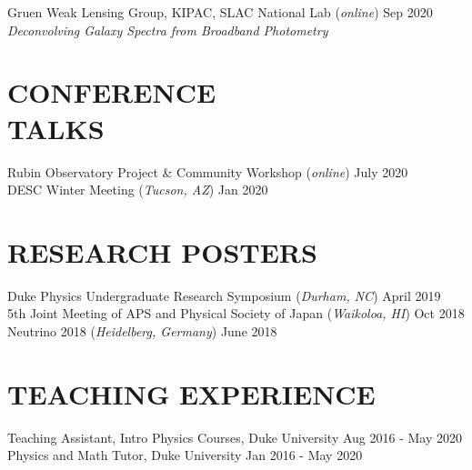 \documentclass[margin]{res}
\begin{document}
\begin{resume}
Gruen Weak Lensing Group, KIPAC, SLAC National Lab (\textit{online}) \hfill Sep 2020 \\
\textit{Deconvolving Galaxy Spectra from Broadband Photometry} \\

\section{\normalfont CONFERENCE \\TALKS}

Rubin Observatory Project \& Community Workshop (\textit{online}) \hfill July 2020 \\
DESC Winter Meeting (\textit{Tucson, AZ}) \hfill Jan 2020 \\

\section{\normalfont RESEARCH POSTERS}

Duke Physics Undergraduate Research Symposium (\textit{Durham, NC}) \hfill April 2019 \\
5th Joint Meeting of APS and Physical Society of Japan (\textit{Waikoloa, HI}) \hfill Oct 2018 \\
Neutrino 2018 (\textit{Heidelberg, Germany}) \hfill June 2018 \\

\section{\normalfont TEACHING EXPERIENCE}

Teaching Assistant, Intro Physics Courses, Duke University \hfill Aug 2016 - May 2020 \\
Physics and Math Tutor, Duke University \hfill Jan 2016 - May 2020 \\



\end{resume}
\end{document}
